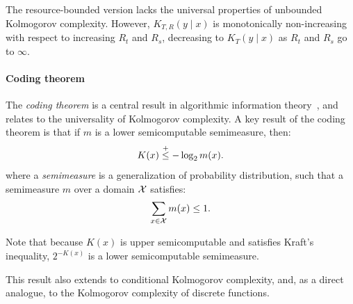 The resource-bounded version lacks the universal properties of unbounded Kolmogorov complexity. However, $K_{T,R}(y \mid x)$ is monotonically non-increasing with respect to increasing $R_t$ and $R_s$, decreasing to $K_T(y \mid x)$ as $R_t$ and $R_s$ go to $\infty$.

\paragraph{Coding theorem}
\label{sec:app-coding-theorem}

The \emph{coding theorem} is a central result in algorithmic information theory~\citep[Section 4]{li2008introduction}, and relates to the universality of Kolmogorov complexity. A key result of the coding theorem is that if $m$ is a lower semicomputable semimeasure, then:
\begin{equation}
    K(x) \leqc -\log_2 m(x).
    \label{eq:coding-theorem}
\end{equation}
where a \emph{semimeasure} is a generalization of probability distribution, such that a semimeasure $m$ over a domain ${\mathcal{X}}$ satisfies:
\begin{equation}
\sum_{x \in {\mathcal{X}}} m(x) \leq 1.
\end{equation}

Note that because $K(x)$ is upper semicomputable and satisfies Kraft's inequality, $2^{-K(x)}$ is a lower semicomputable semimeasure.

This result also extends to conditional Kolmogorov complexity, and, as a direct analogue, to the Kolmogorov complexity of discrete functions.
